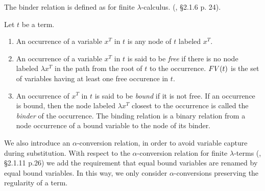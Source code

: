 The binder relation is defined as for finite $\lambda$-calculus.
(\cite{Barendregt1984}, \S 2.1.6 p. 24). 

\begin{definition}
\label{definition-binder-relation}
Let $t$ be a term.
\begin{enumerate}
\item
An occurrence of a variable $x^T$ in $t$ is any node of $t$ labeled $x^T$.
\item
An occurrence of a variable $x^T$ in $t$ is said to be \emph{free} if there is no node labeled $\lambda x^T$
in the path from the root of $t$ to the occurrence. 
${{\relax FV}}(t)$ is the set of variables having at least one free occurence in $t$.
\item
An occurrence of $x^T$ in $t$ is said to be \emph{bound} if it is not free. If an occurrence is bound, then
the node labeled $\lambda x^T$ closest to the occurrence is called the \emph{binder} of
the occurrence.
The binding relation is a binary relation from a node occurrence of a bound variable to the node of its binder. 
\end{enumerate}
\end{definition}

We also introduce an $\alpha$-conversion relation, in order to avoid variable capture
during substitution. With respect to the $\alpha$-conversion
relation for finite $\lambda$-terms 
(\cite{Barendregt1984}, \S 2.1.11 p.26) 
we add the requirement that equal bound variables are renamed by equal bound variables. 
In this way, we only consider $\alpha$-conversions 
preserving the regularity of a term.


